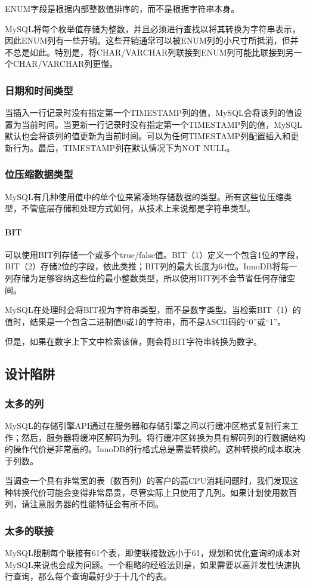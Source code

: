 ENUM字段是根据内部整数值排序的，而不是根据字符串本身。

MySQL将每个枚举值存储为整数，并且必须进行查找以将其转换为字符串表示，因此ENUM列有一些开销。这些开销通常可以被ENUM列的小尺寸所抵消，但并不总是如此。特别是，将CHAR/VARCHAR列联接到ENUM列可能比联接到另一个CHAR/VARCHAR列更慢。

\subsubsection{日期和时间类型}

当插入一行记录时没有指定第一个TIMESTAMP列的值，MySQL会将该列的值设置为当前时间。当更新一行记录时没有指定第一个TIMESTAMP列的值，MySQL默认也会将该列的值更新为当前时间。可以为任何TIMESTAMP列配置插入和更新行为。最后，TIMESTAMP列在默认情况下为NOT NULL。

\subsubsection{位压缩数据类型}

MySQL有几种使用值中的单个位来紧凑地存储数据的类型。所有这些位压缩类型，不管底层存储和处理方式如何，从技术上来说都是字符串类型。

\paragraph*{BIT} 可以使用BIT列存储一个或多个true/false值。BIT（1）定义一个包含1位的字段，BIT（2）存储2位的字段，依此类推；BIT列的最大长度为64位。InnoDB将每一列存储为足够容纳这些位的最小整数类型，所以使用BIT列不会节省任何存储空间。

MySQL在处理时会将BIT视为字符串类型，而不是数字类型。当检索BIT（1）的值时，结果是一个包含二进制值0或1的字符串，而不是ASCII码的“0”或“1”。

但是，如果在数字上下文中检索该值，则会将BIT字符串转换为数字。

\subsection{设计陷阱}

\subsubsection*{太多的列}

MySQL的存储引擎API通过在服务器和存储引擎之间以行缓冲区格式复制行来工作；然后，服务器将缓冲区解码为列。将行缓冲区转换为具有解码列的行数据结构的操作代价是非常高的。InnoDB的行格式总是需要转换的。这种转换的成本取决于列数。

当调查一个具有非常宽的表（数百列）的客户的高CPU消耗问题时，我们发现这种转换代价可能会变得非常昂贵，尽管实际上只使用了几列。如果计划使用数百列，请注意服务器的性能特征会有所不同。

\subsubsection*{太多的联接}

MySQL限制每个联接有61个表，即使联接数远小于61，规划和优化查询的成本对MySQL来说也会成为问题。一个粗略的经验法则是，如果需要以高并发性快速执行查询，那么每个查询最好少于十几个的表。

\newpage